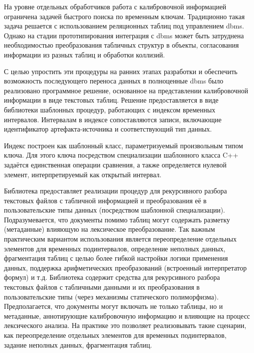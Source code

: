 На уровне отдельных обработчиков работа с калибровочной информацией
ограничена задачей быстрого поиска по временным ключам.
Традиционно такая задача решается с
использованием реляционных таблиц под управлением \acrshort{dbms}.
Однако на стадии прототипирования интеграция с \acrshort{dbms}
может быть затруднена необходимостью преобразования табличных структур в объекты,
согласования информации из разных таблиц и обработки коллизий.

С целью упростить эти процедуры на ранних этапах разработки и
обеспечить возможность последующего переноса данных в полноценные
\acrshort{dbms} было реализовано программное решение, основанное на
представлении калибровочной информации в виде текстовых таблиц.
Решение предоставляется в виде библиотеки шаблонных
процедур, работающих с индексом временных интервалов. Интервалам
в индексе сопоставляются записи, включающие идентификатор
артефакта-источника и соответствующий тип данных.

Индекс построен как шаблонный класс, параметризуемый произвольным
типом ключа. Для этого ключа посредством специализации шаблонного
класса C++ задаётся единственная операции сравнения, а также определяется
нулевой элемент, интерпретируемый как открытый интервал.

Библиотека предоставляет реализации процедур для рекурсивного
разбора текстовых файлов с табличной информацией и преобразования
её в пользовательские типы данных (посредством шаблонной
специализации). Подразумевается, что документы помимо таблиц могут
содержать разметку (метаданные) влияющую на
лексическое преобразование. Так важным практическим вариантом
использования  является переопределение отдельных элементов для
временных подинтервалов, определение неполных данных, фрагментация
таблиц с целью более гибкой настройки логики применения данных,
поддержка арифметических преобразований (встроенный интерпретатор
формул) и т.д.
Библиотека содержит средства для рекурсивного разбора текстовых файлов
с табличными данными и их преобразования в пользовательские типы
(через механизмы статического полиморфизма). Предполагается,
что документы могут включать не только таблицы, но и метаданные,
аннотирующие калибровочную информацию и влияющие на процесс
лексического анализа. На практике это позволяет реализовывать
такие сценарии, как переопределение отдельных элементов для
временных подинтервалов, задание неполных данных, фрагментация
таблиц.

